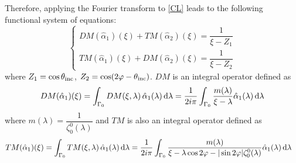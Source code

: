 Therefore, applying the Fourier transform to \eqref{CL} leads to the following functional system of equations:
\begin{equation}
\label{functional_eq}
\begin{cases}
DM(\hat{\alpha}_1)(\xi) + TM(\hat{\alpha}_2)(\xi) = \dfrac{1}{\xi - Z_1} \\
TM(\hat{\alpha}_1)(\xi) + DM(\hat{\alpha}_2)(\xi)  = \dfrac{1}{\xi - Z_2} 
\end{cases}
\end{equation}
where $Z_1 =  \cos \theta_{\rm inc}$, $Z_2 =  \cos (2\varphi - \theta_{\rm inc})$. $DM$ is an integral operator defined as
\begin{equation}
\label{DM_operator}
\begin{split}
DM(\hat{\alpha}_1)(\xi) = \int_{\Gamma_0} DM(\xi,\lambda) \, \hat{\alpha}_1(\lambda) \, {\rm d} \lambda =\dfrac{1}{2i\pi} \int_{\Gamma_0} \dfrac{m(\lambda)  }{\xi - \lambda} \hat{\alpha}_1(\lambda) \, {\rm d} \lambda
\end{split}
\end{equation}
where $m(\lambda) = \dfrac{1}{\zeta_0^0(\lambda)}$ and $TM$ is also an integral operator defined as
\begin{equation}
\label{TM_operator}
\begin{split}
TM(\hat{\alpha}_1)(\xi) &= \int_{\Gamma_0} TM(\xi,\lambda) \, \hat{\alpha}_1(\lambda) \, {\rm d} \lambda =\dfrac{1}{2i\pi} \int_{\Gamma_0} \dfrac{ m(\lambda)}{ \xi- \lambda \cos 2\varphi  - |\sin 2\varphi| \zeta_0^0(\lambda)} \hat{\alpha}_1(\lambda) \, {\rm d} \lambda 
\end{split}
\end{equation}


